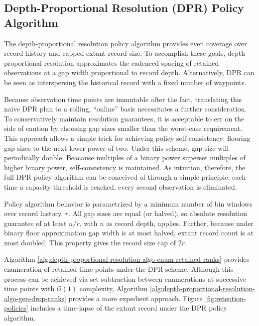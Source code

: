 \subsection{Depth-Proportional Resolution (DPR) Policy Algorithm}
\label{sec:depth-proportional-resolution-algo}

The depth-proportional resolution policy algorithm provides even coverage over record history and capped extant record size.
To accomplish these goals, depth-proportional resolution approximates the cadenced spacing of retained observations at a gap width proportional to record depth.
Alternatively, DPR can be seen as interspersing the historical record with a fixed number of waypoints.

Because observation time points are immutable after the fact, translating this naive DPR plan to a rolling, ``online'' basis necessitates a further consideration.
To conservatively maintain resolution guarantees, it is acceptable to err on the side of caution by choosing gap sizes smaller than the worst-case requirement.
This approach allows a simple trick for achieving policy self-consistency: flooring gap sizes to the next lower power of two.
Under this scheme, gap size will periodically double.
Beacause multiples of a binary power superset multiples of higher binary power, self-consistency is maintained.
As intuition, therefore, the full DPR policy algorithm can be conceived of through a simple principle: %
each time a capacity threshold is reached, every second observation is eliminated.

Policy algorithm behavior is parametrized by a minimum number of bin windows over record history, $r$.
All gap sizes are equal (or halved), so absolute resolution guarantee of at least $n/r$, with $n$ as record depth, applies.
Further, because under binary floor approximation gap width is at most halved, extant record count is at most doubled.
This property gives the record size cap of $2r$.

Algorithm \ref{alg:depth-proportional-resolution-algo-enum-retained-ranks} provides enumeration of retained time points under the DPR scheme.
Although this process can be achieved via set subtraction between enumerations at successive time points with $\mathcal{O}(1)$ complexity, Algorithm \ref{alg:depth-proportional-resolution-algo-gen-drop-ranks} provides a more expedient approach.
Figure \ref{fig:retention-policies} includes a time-lapse of the extant record under the DPR policy algorithm.

